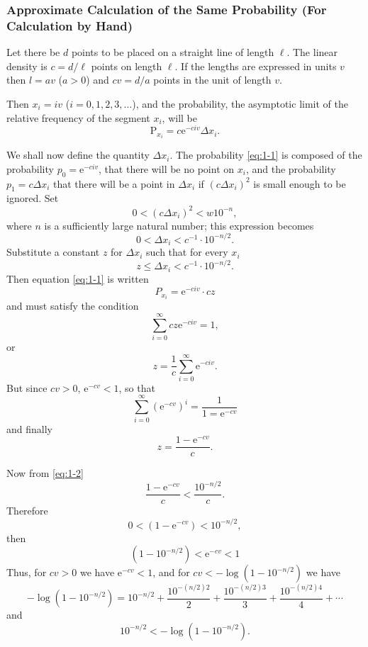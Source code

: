 \documentclass[letterpaper, 11pt]{article}
\begin{document}
\subsubsection*{Approximate Calculation of the Same Probability (For Calculation by Hand)}

Let there be \( d \) points to be placed on a straight line of length \( \ell \).
The linear density is \( c = d / \ell \) points on length \( \ell \).
If the lengths are expressed in units \( v \) then \( l = av \) (\( a > 0 \)) and \( cv = d / a \) points in the unit of length \( v \).

Then \( x_i = iv \) (\( i = 0, 1, 2, 3, \dots \)), and the probability, the asymptotic limit of the relative frequency of the segment \( x_i \), will be
\[
    \mathrm{P}_{x_i} = c \mathrm{e}^{-civ} \Delta x_i .
    \tag{1}
    \label{eq:1-1}
\]

We shall now define the quantity \( \Delta x_i \).
The probability \eqref{eq:1-1} is composed of the probability \( p_0 = \mathrm{e}^{-civ} \), that there will be no point on \( x_i \), and the probability \( p_1 = c \Delta x_i \) that there will be a point in \( \Delta x_i \) if \( ( c \Delta x_i )^2 \) is small enough to be ignored.
Set
\[ 0 < (c \Delta x_i)^2 < w 10^{-n}, \]
where \( n \) is a sufficiently large natural number; this expression becomes
\[ 0 < \Delta x_i < c^{-1} \cdot 10^{-n/2} . \]
Substitute a constant \( z \) for \( \Delta x_i \) such that for every \( x_i \)
\[
    z \leq \Delta x_i < c^{-1} \cdot 10^{-n/2} .
    \tag{2}
    \label{eq:1-2}
\]
Then equation \eqref{eq:1-1} is written
\[
    P_{x_i} = \mathrm{e}^{-civ} \cdot cz
    \tag{3}
    \label{eq:1-3}
\]
and must satisfy the condition
\[ \sum_{i=0}^\infty cz \mathrm{e}^{-civ} = 1 ,\]
or
\[ z = \frac{1}{c} \sum_{i=0}^\infty \mathrm{e}^{-civ} .\]
But since \( cv > 0 \), \( \mathrm{e}^{-cv} < 1 \), so that
\[ \sum_{i=0}^\infty \left( \mathrm{e}^{-cv} \right)^i =\frac{1}{1 = \mathrm{e}^{-cv}} \]
and finally
\[ z = \frac{1 - \mathrm{e}^{-cv}}{c} .\]

Now from \ref{eq:1-2}
\[ \frac{1 - \mathrm{e}^{-cv}}{c} < \frac{10^{-n/2}}{c} . \]
Therefore
\[ 0 < \left( 1 - \mathrm{e}^{-cv} \right) < 10^{-n/2} , \]
then
\[ \left( 1 - 10^{-n/2} \right) < \mathrm{e}^{-cv} < 1 \]
Thus, for \( cv > 0 \) we have \( \mathrm{e}^{-cv} < 1 \), and for \( cv < - \log{\left( 1 - 10^{-n/2} \right)} \) we have
\[ - \log{\left( 1 - 10^{-n/2} \right)} = 10^{-n/2} + \frac{10^{-(n/2)2}}{2} + \frac{10^{-(n/2)3}}{3} +  \frac{10^{-(n/2)4}}{4} + \cdots \]
and
\[ 10^{-n/2} < - \log{\left( 1 - 10^{-n/2}\right)} .\]
\end{document}
